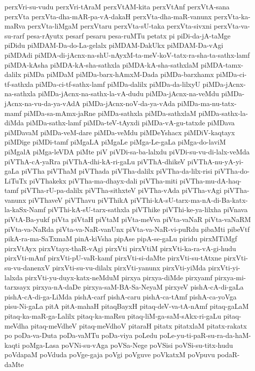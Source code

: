 {perxVri-su-vudu
perxVri-tAraM
perxVtAM-kita
perxVtAnf
perxVtA-sana
perxVta
perxVta-dha-mAR-pa-vA-dakaH
perxVta-dha-maR-vanunx
perxVta-ka-maRva
perxVta-liMgaM
perxVtaru
perxVta-sU-taka
perxVta-sivxni
perxVta-va-su-rarf
pesa-rAyutx
pesarf
pesaru
pesa-ruMTu
petatx
pi
piDi-da-jA-taMge
piDidu
piMDAM-Da-do-La-gelalx
piMDAM-DakUkx
piMDAM-Da-vAgi
piMDAdi
piMDA-di-jAcnx-na-shU-nAyxM-ta-meV-koV-tatx-ra-sha-ta-sathx-lamf
piMDA-kAsha
piMDA-kA-sha-sathxla
piMDA-kA-sha-sathxlaM
piMDA-tamx-dalilx
piMDa
piMDaM
piMDa-barx-hAmxM-Dada
piMDa-barxhamx
piMDa-ci-tf-sathxla
piMDa-ci-tf-sathx-lamf
piMDa-dalilx
piMDa-da-lilxyU
piMDa-jAcnx-na-sathxla
piMDa-jAcnx-na-sathx-la-vA-dudu
piMDa-jAcnx-na-veMdu
piMDa-jAcnx-na-vu-da-ya-vAdA
piMDa-jAcnx-noV-da-ya-vAda
piMDa-ma-nu-tatx-mamf
piMDa-sa-mAmx-jaRne
piMDa-sathxla
piMDa-sathxlaM
piMDa-sathx-la-diMda
piMDa-sathx-lamf
piMDa-teV-tAyxdi
piMDa-vA-gu-tatxde
piMDava
piMDavaM
piMDa-veM-dare
piMDa-veMdu
piMDeYshacx
piMDiV-kaqtayx
piMDige
piMDi-tamf
piMgaLA
piMgaLe
piMga-Le-gaLa
piMga-do-laviM
piMgalA
piMga-leVDA
piMte
piV
piVDi-sa-ba-lalxdu
piVDi-su-vu-di-lalx-veMda
piVThA-cA-yaRra
piVThA-dhi-kA-ri-gaLu
piVThA-dhikeV
piVThA-nu-yA-yi-gaLa
piVTha
piVThaM
piVThada
piVTha-dalilx
piVTha-da-lilx-risi
piVTha-do-LiTuTx
piVThakekx
piVTha-ma-dhayx-dali
piVTha-miti
piVTha-mu-dA-haq-tamf
piVTha-rU-pa-dalilx
piVTha-sithxteV
piVTha-vAda
piVTha-vAgi
piVTha-vanunx
piVThaveV
piVThavu
piVThikA
piVThi-kA-sU-tarx-ma-nA-di-Ba-katx-la-kaSx-Namf
piVThi-kA-sU-tarx-sathxla
piVThike
piVThi-ke-ya-lilxha
piVnava
piVtA-Ba-yukf
piVta
piVtaH
piVtaM
piVta-meVva
piVta-vaNaR
piVta-vaNaRM
piVta-va-NaRda
piVta-va-NaR-vanUnx
piVta-va-NaR-vi-puRdu
pibaMti
pibeVtf
pikA-ra-ma-SaTxmaM
pinA-kiVsha
pipAse
pipA-se-gaLu
piridu
pirxMTiMgf
pirxVtAyx
pirxVtayx-thaR-vAgi
pirxVti
pirxVtiM
pirxVti-ka-ra-vA-gi-hudu
pirxVti-mAnf
pirxVti-pU-vaR-kamf
pirxVti-si-daMte
pirxVti-su-tAtxne
pirxVti-su-vu-danenxV
pirxVti-su-vu-dilalx
pirxVti-yanunx
pirxVti-yiMda
pirxVti-yi-lalxda
pirxVti-yu-duyx-katx-neMduM
pirxya
pirxya-diMde
pirxyamf
pirxya-mi-tarxsayx
pirxya-nA-daDe
pirxya-saM-BA-Sa-NeyaM
pirxyeV
pishA-cA-di-gaLa
pishA-cA-di-ga-LiMda
pishA-carf
pishA-caru
pishA-ca-tAmf
pishA-ca-yoVga
pisu-Ni-gaLa
pitA
pitA-mahaH
pitaqBayxH
pitaq-deV-va-tA-nAmf
pitaq-gaLaM
pitaq-ka-maR-ga-Lalilx
pitaq-ka-maRsu
pitaq-liM-ga-saM-sAkx-ri-gaLu
pitaq-meVdha
pitaq-meVdheV
pitaq-meVdhoV
pitaraH
pitatx
pitatxlaM
pitatx-rakatx
po
poDa-va-Duta
poDa-vaMTu
poDa-viya
poLedu
poLe-yu-ti-paR-su-ra-da-haM-kaqti
poMga-Lasa
poVNi-su-vAga
poVSa-Nege
poVSisi
poVSi-su-titx-hudu
poVdapaM
poVduda
poVge-gaja
poVgi
poVguve
poVkatxM
poVpuvu
podaR-daMte
}
